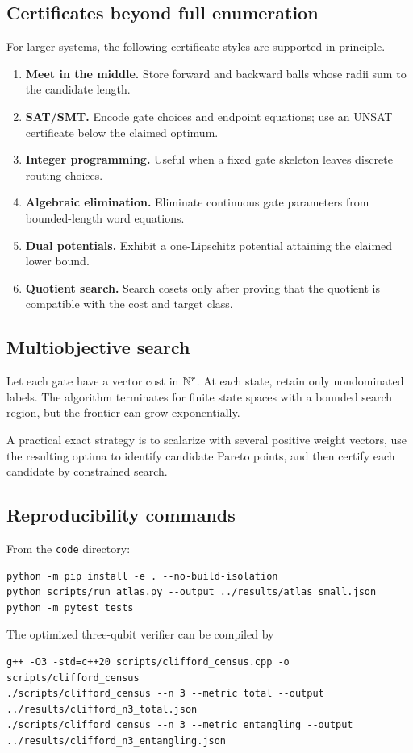 \subsection{Certificates beyond full enumeration}
For larger systems, the following certificate styles are supported in principle.
\begin{enumerate}
\item \textbf{Meet in the middle.}  Store forward and backward balls whose radii sum to the candidate length.
\item \textbf{SAT/SMT.}  Encode gate choices and endpoint equations; use an UNSAT certificate below the claimed optimum.
\item \textbf{Integer programming.}  Useful when a fixed gate skeleton leaves discrete routing choices.
\item \textbf{Algebraic elimination.}  Eliminate continuous gate parameters from bounded-length word equations.
\item \textbf{Dual potentials.}  Exhibit a one-Lipschitz potential attaining the claimed lower bound.
\item \textbf{Quotient search.}  Search cosets only after proving that the quotient is compatible with the cost and target class.
\end{enumerate}

\subsection{Multiobjective search}
Let each gate have a vector cost in $\mathbb N^r$.  At each state, retain only nondominated labels.  The algorithm terminates for finite state spaces with a bounded search region, but the frontier can grow exponentially.

A practical exact strategy is to scalarize with several positive weight vectors, use the resulting optima to identify candidate Pareto points, and then certify each candidate by constrained search.

\subsection{Reproducibility commands}
From the \texttt{code} directory:
\begin{lstlisting}[style=pythonstyle,caption={Python atlas commands.}]
python -m pip install -e . --no-build-isolation
python scripts/run_atlas.py --output ../results/atlas_small.json
python -m pytest tests
\end{lstlisting}
The optimized three-qubit verifier can be compiled by
\begin{lstlisting}[style=cppstyle,caption={C++ Clifford verifier.}]
g++ -O3 -std=c++20 scripts/clifford_census.cpp -o scripts/clifford_census
./scripts/clifford_census --n 3 --metric total --output ../results/clifford_n3_total.json
./scripts/clifford_census --n 3 --metric entangling --output ../results/clifford_n3_entangling.json
\end{lstlisting}

